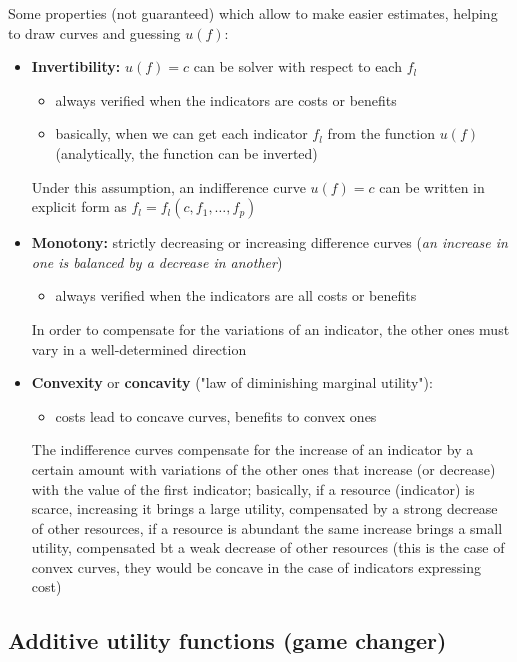 Some properties (not guaranteed) which allow to make easier estimates, helping to draw curves and guessing $u(f)$:
\begin{itemize}
	\item \textbf{Invertibility:} $u(f)= c$ can be solver with respect to each $f_l$
	\begin{itemize}
		\item always verified when the indicators are costs or benefits
		
		\item basically, when we can get each indicator $f_l$ from the function $u(f)$ (analytically, the function can be inverted)
	\end{itemize}
	Under this assumption, an indifference curve $u(f) = c$ can be written in explicit form as $f_l = f_l (c, f_1, \dots, f_p)$
	
	\item \textbf{Monotony:} strictly decreasing or increasing difference curves (\textit{an increase in one is balanced by a decrease in another})
	\begin{itemize}
		\item always verified when the indicators are all costs or benefits
	\end{itemize}
	In order to compensate for the variations of an indicator, the other ones must vary in a well-determined direction
	
	\item \textbf{Convexity} or \textbf{concavity} ("law of diminishing marginal utility"): 
	\begin{itemize}
		\item costs lead to concave curves, benefits to convex ones
	\end{itemize}
	The indifference curves compensate for the increase of an indicator by a certain amount with variations of the other ones that increase (or decrease) with the value of the first indicator; basically, if a resource (indicator) is scarce, increasing it brings a large utility, compensated by a strong decrease of other resources, if a resource is abundant the same increase brings a small utility, compensated bt a weak decrease of other resources (this is the case of convex curves, they would be concave in the case of indicators expressing cost)
\end{itemize}

\subsection{Additive utility functions (game changer)}
\label{subsec:additiveutil}

